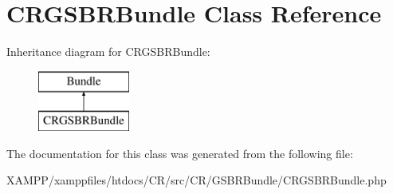 \section{C\+R\+G\+S\+B\+R\+Bundle Class Reference}
\label{class_c_r_1_1_g_s_b_r_bundle_1_1_c_r_g_s_b_r_bundle}
Inheritance diagram for C\+R\+G\+S\+B\+R\+Bundle\+:\begin{figure}[H]
\begin{center}
\leavevmode
\includegraphics[height=2.000000cm]{class_c_r_1_1_g_s_b_r_bundle_1_1_c_r_g_s_b_r_bundle}
\end{center}
\end{figure}


The documentation for this class was generated from the following file\+:\begin{DoxyCompactItemize}
\item 
X\+A\+M\+P\+P/xamppfiles/htdocs/\+C\+R/src/\+C\+R/\+G\+S\+B\+R\+Bundle/C\+R\+G\+S\+B\+R\+Bundle.\+php\end{DoxyCompactItemize}
